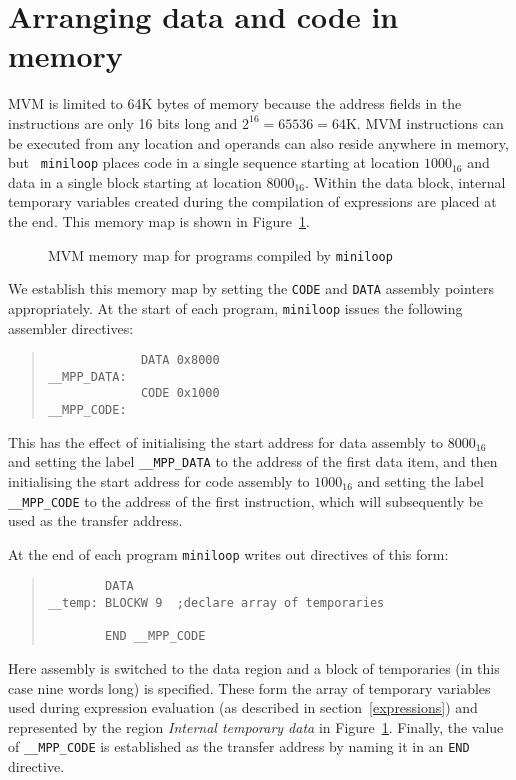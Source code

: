 \section{Arranging data and code in memory} MVM is limited to 64K bytes of
memory because the address fields in the instructions are only 16 bits
long and $2^{16}= 65536 = 64$K. MVM instructions can be executed from
any location and operands can also reside anywhere in memory, but {\tt
miniloop} places code in a single sequence starting at
location $1000_{16}$ and data in a single block starting at location
$8000_{16}$. Within the data block, internal temporary variables created
during the compilation of expressions are placed at the end. This memory
map is shown in Figure~\ref{miniloop:map}.
\begin{figure}
\begin{center}

\end{center}
\caption{MVM memory map for programs compiled by {\tt miniloop}}
\label{miniloop:map}
\end{figure}

We establish this memory map by setting the {\tt CODE} and {\tt DATA} assembly pointers
appropriately. At the start of each program, {\tt miniloop} issues the following assembler
directives:
\begin{quote}
\small
\begin{verbatim}
             DATA 0x8000
__MPP_DATA:
             CODE 0x1000
__MPP_CODE:
\end{verbatim}
\end{quote}

This has the effect of initialising the start address for data assembly
to $8000_{16}$ and setting the label \verb+__MPP_DATA+ to the address of
the first data item, and then initialising the start address for code
assembly to $1000_{16}$ and  setting the label \verb+__MPP_CODE+ to the
address of the first instruction, which will subsequently be used as the
transfer address.

At the end of each program {\tt miniloop} writes out directives of this form:
\begin{quote}
\small
\begin{verbatim}
        DATA
__temp: BLOCKW 9  ;declare array of temporaries

        END __MPP_CODE
\end{verbatim}
\end{quote}
\label{wrapper}
Here assembly is switched to the data region and a block of temporaries
(in this case nine words long) is specified. These form the array of
temporary variables used during expression evaluation (as described in
section~\ref{expressions}) and represented by the region {\em Internal
temporary data} in Figure~\ref{miniloop:map}. Finally, the value of
\verb+__MPP_CODE+ is established as the transfer address by naming it in
an {\tt END} directive.

